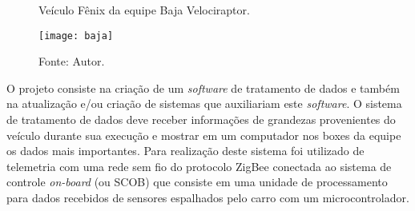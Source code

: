 
\begin{figure}[!htb]
	\centering
		\caption{Veículo Fênix da equipe Baja Velociraptor.}
		\texttt{[image: baja]} 
		\caption*{Fonte: Autor.}
		\label{fig:Baja}
\end{figure} 


O projeto consiste na criação de um \textit{software} de tratamento de dados e também na atualização e/ou criação de sistemas que auxiliariam este \textit{software}. O sistema de tratamento de dados deve receber informações de grandezas provenientes do veículo durante sua execução e mostrar em um computador nos boxes da equipe os dados mais importantes. Para realização deste sistema foi utilizado de telemetria com uma rede sem fio do protocolo ZigBee conectada ao sistema de controle \textit{on-board} (ou SCOB) que consiste em uma unidade de processamento para dados recebidos de sensores espalhados pelo carro com um microcontrolador.   

